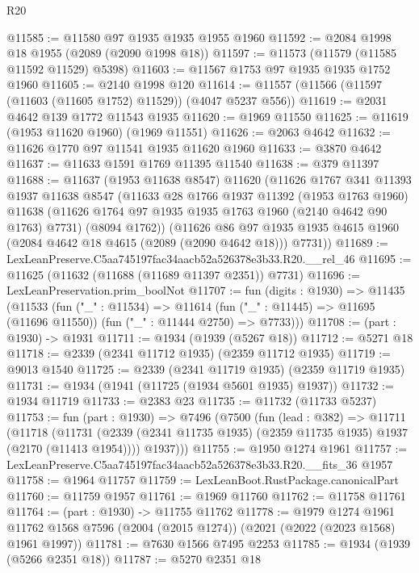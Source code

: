 \begin{lexlean}{R20}
\begin{coremodule}
@11585 := @11580 @97 @1935 @1935 @1955 @1960
@11592 := @2084 @1998 @18 @1955 (@2089 (@2090 @1998 @18))
@11597 := @11573 (@11579 (@11585 @11592 @11529) @5398)
@11603 := @11567 @1753 @97 @1935 @1935 @1752 @1960
@11605 := @2140 @1998 @120
@11614 := @11557 (@11566 (@11597 (@11603 (@11605 @1752) @11529)) (@4047 @5237 @556))
@11619 := @2031 @4642 @139 @1772 @11543 @1935
@11620 := @1969 @11550
@11625 := @11619 (@1953 @11620 @1960) (@1969 @11551)
@11626 := @2063 @4642
@11632 := @11626 @1770 @97 @11541 @1935 @11620 @1960
@11633 := @3870 @4642
@11637 := @11633 @1591 @1769 @11395 @11540
@11638 := @379 @11397
@11688 := @11637
    (@1953 @11638 @8547)
    @11620
    (@11626
      @1767
      @341
      @11393
      @1937
      @11638
      @8547
      (@11633
        @28
        @1766
        @1937
        @11392
        (@1953 @1763 @1960)
        @11638
        (@11626 @1764 @97 @1935 @1935 @1763 @1960 (@2140 @4642 @90 @1763) @7731)
        (@8094 @1762))
      (@11626
        @86
        @97
        @1935
        @1935
        @4615
        @1960
        (@2084 @4642 @18 @4615 (@2089 (@2090 @4642 @18)))
        @7731))
@11689 := LexLeanPreserve.C5aa745197fac34aacb52a526378e3b33.R20.__rel_46
@11695 := @11625 (@11632 (@11688 (@11689 @11397 @2351)) @7731)
@11696 := LexLeanPreservation.prim_boolNot
@11707 := fun (digits : @1930) =>
  @11435
    (@11533
      (fun ("_" : @11534) =>
      @11614 (fun ("_" : @11445) => @11695 (@11696 @11550)) (fun ("_" : @11444 @2750) => @7733)))
@11708 := (part : @1930) -> @1931
@11711 := @1934 (@1939 (@5267 @18))
@11712 := @5271 @18
@11718 := @2339 (@2341 @11712 @1935) (@2359 @11712 @1935)
@11719 := @9013 @1540
@11725 := @2339 (@2341 @11719 @1935) (@2359 @11719 @1935)
@11731 := @1934 (@1941 (@11725 (@1934 @5601 @1935) @1937))
@11732 := @1934 @11719
@11733 := @2383 @23
@11735 := @11732 (@11733 @5237)
@11753 := fun (part : @1930) =>
  @7496
    (@7500
      (fun (lead : @382) =>
      @11711
        (@11718
          (@11731 (@2339 (@2341 @11735 @1935) (@2359 @11735 @1935) @1937 (@2170 (@11413 @1954))))
          @1937)))
@11755 := @1950 @1274 @1961
@11757 := LexLeanPreserve.C5aa745197fac34aacb52a526378e3b33.R20.__fits_36 @1957
@11758 := @1964 @11757
@11759 := LexLeanBoot.RustPackage.canonicalPart
@11760 := @11759 @1957
@11761 := @1969 @11760
@11762 := @11758 @11761
@11764 := (part : @1930) -> @11755 @11762
@11778 := @1979
    @1274
    @1961
    @11762
    @1568
    @7596
    (@2004 (@2015 @1274))
    (@2021 (@2022 (@2023 @1568) @1961 @1997))
@11781 := @7630 @1566 @7495 @2253
@11785 := @1934 (@1939 (@5266 @2351 @18))
@11787 := @5270 @2351 @18

\end{coremodule}
\end{lexlean}
